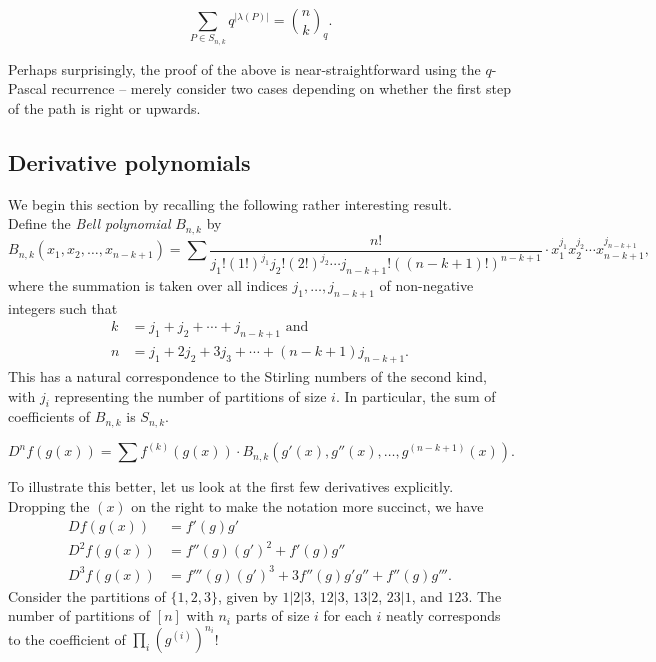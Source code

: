 	\begin{ftheo}
		\[ \sum_{P \in S_{n,k}} q^{|\lambda(P)|} = \binom{n}{k}_q. \]
	\end{ftheo}
	Perhaps surprisingly, the proof of the above is near-straightforward using the $q$-Pascal recurrence -- merely consider two cases depending on whether the first step of the path is right or upwards.

\subsection{Derivative polynomials}

	We begin this section by recalling the following rather interesting result.\\
	Define the \emph{Bell polynomial} $B_{n,k}$ by
	\[ B_{n,k}(x_1,x_2,\ldots,x_{n-k+1}) = \sum \frac{n!}{j_1! (1!)^{j_1} j_2! (2!)^{j_2} \cdots j_{n-k+1}! ((n-k+1)!)^{n-k+1}} \cdot x_1^{j_1} x_2^{j_2} \cdots x_{n-k+1}^{j_{n-k+1}}, \]
	where the summation is taken over all indices $j_1,\ldots,j_{n-k+1}$ of non-negative integers such that
	\begin{align*}
		k &= j_1 + j_2 + \cdots + j_{n-k+1} \text{ and} \\
		n &= j_1 + 2j_2 + 3j_3 + \cdots + (n-k+1)j_{n-k+1}.
	\end{align*}
	This has a natural correspondence to the Stirling numbers of the second kind, with $j_i$ representing the number of partitions of size $i$. In particular, the sum of coefficients of $B_{n,k}$ is $S_{n,k}$.

	\begin{fprop}
		\[ D^n f(g(x)) = \sum f^{(k)}(g(x)) \cdot B_{n,k} (g'(x), g''(x), \ldots, g^{(n-k+1)}(x)). \]
	\end{fprop}

	To illustrate this better, let us look at the first few derivatives explicitly. Dropping the $(x)$ on the right to make the notation more succinct, we have
	\begin{align*}
		Df(g(x)) &= f'(g) g' \\
		D^2f(g(x)) &= f''(g) (g')^2 + f'(g) g'' \\
		D^3f(g(x)) &= f'''(g) (g')^3 + 3 f''(g) g' g'' + f''(g) g'''.
	\end{align*}
	Consider the partitions of $\{1,2,3\}$, given by $1|2|3$, $12|3$, $13|2$, $23|1$, and $123$. The number of partitions of $[n]$ with $n_i$ parts of size $i$ for each $i$ neatly corresponds to the coefficient of $\prod_i (g^{(i)})^{n_i}$!

